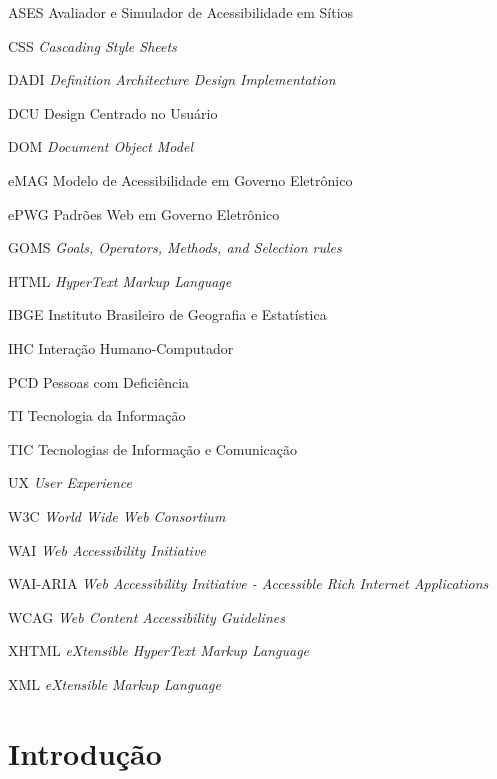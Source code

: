 \documentclass[
  12pt,
  openright,
  twoside,
  a4paper,
  english,
  french,
  spanish,
  brazil
]{abntex2}
\begin{document}
\begin{siglas}
  \item[ASES] Avaliador e Simulador de Acessibilidade em Sítios
  \item[CSS] \textit{Cascading Style Sheets}
  \item[DADI] \textit{Definition Architecture Design Implementation}
  \item[DCU] Design Centrado no Usuário
  \item[DOM] \textit{Document Object Model}
  \item[eMAG] Modelo de Acessibilidade em Governo Eletrônico
  \item[ePWG] Padrões Web em Governo Eletrônico
  \item[GOMS] \textit{Goals, Operators, Methods, and Selection rules}
  \item[HTML] \textit{HyperText Markup Language}
  \item[IBGE] Instituto Brasileiro de Geografia e Estatística
  \item[IHC] Interação Humano-Computador
  \item[PCD] Pessoas com Deficiência
  \item[TI] Tecnologia da Informação
  \item[TIC] Tecnologias de Informação e Comunicação
  \item[UX] \textit{User Experience}
  \item[W3C] \textit{World Wide Web Consortium}
  \item[WAI] \textit{Web Accessibility Initiative}
  \item[WAI-ARIA]
    \textit{
      Web Accessibility Initiative - Accessible Rich Internet Applications
    }
  \item[WCAG] \textit{Web Content Accessibility Guidelines}
  \item[XHTML] \textit{eXtensible HyperText Markup Language}
  \item[XML] \textit{eXtensible Markup Language}
\end{siglas}

\tableofcontents*
\cleardoublepage

\textual

\chapter{Introdução}
\end{document}
